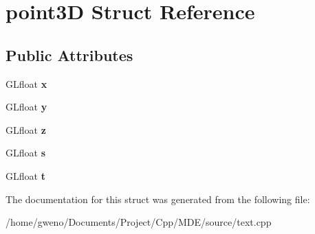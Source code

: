 \hypertarget{structpoint3D}{}\section{point3D Struct Reference}
\label{structpoint3D}
\subsection*{Public Attributes}
\begin{DoxyCompactItemize}
\item 
G\+Lfloat {\bfseries x}\hypertarget{structpoint3D_a51b02076b07ec76a84d46d4157d2c137}{}\label{structpoint3D_a51b02076b07ec76a84d46d4157d2c137}

\item 
G\+Lfloat {\bfseries y}\hypertarget{structpoint3D_af2c4758cda83b9bd57534ca993f5fcdb}{}\label{structpoint3D_af2c4758cda83b9bd57534ca993f5fcdb}

\item 
G\+Lfloat {\bfseries z}\hypertarget{structpoint3D_a95e9ab1bc61b4d2668f5fb9b5df7f350}{}\label{structpoint3D_a95e9ab1bc61b4d2668f5fb9b5df7f350}

\item 
G\+Lfloat {\bfseries s}\hypertarget{structpoint3D_a6888328091d1c9a9b0738c0df98fd7ba}{}\label{structpoint3D_a6888328091d1c9a9b0738c0df98fd7ba}

\item 
G\+Lfloat {\bfseries t}\hypertarget{structpoint3D_a4ca2494f98eeb9340a1bbb78c85bce3d}{}\label{structpoint3D_a4ca2494f98eeb9340a1bbb78c85bce3d}

\end{DoxyCompactItemize}


The documentation for this struct was generated from the following file\+:\begin{DoxyCompactItemize}
\item 
/home/gweno/\+Documents/\+Project/\+Cpp/\+M\+D\+E/source/text.\+cpp\end{DoxyCompactItemize}

